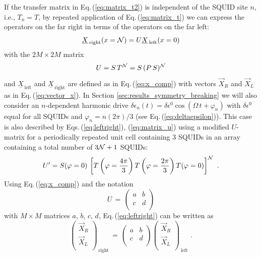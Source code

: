If the transfer matrix in Eq.\,(\ref{eq:matrix_t2}) is independent of the SQUID site $n$, 
i.e., $T_n = T$, by repeated application of Eq.\,(\ref{eq:matrix_t}) we can express the 
operators on the far right in terms of the operators on the far left:
%
\begin{equation} \label{eq:leftright}
\underline{X}_{\, \text{right}}(x={\cal N}) = U \underline{X}_{\,\text{left}}(x=0)
\end{equation}
%
with the $2M \times 2M$ matrix
%
\begin{equation} \label{eq:matrix_u}
U = S \, T^{\cal N} = S \, (P \, S)^{\cal N}
\end{equation}
%
and $\underline{X}_{\,\text{left}}$ and $\underline{X}_{\,\text{right}}$ are defined 
as in Eq.\,(\ref{eq:x_comp}) with vectors $\vec{X}_R$ and $\vec{X}_L$ as in 
Eq.\,(\ref{eq:vector_x}). 
In Section \ref{sec:results_symmetry_breaking} we will also consider an $n$-dependent harmonic drive 
$\delta \epsilon_n(t) = \delta \epsilon^0 \cos(\Omega \, t + \varphi_n)$
with $\delta \epsilon^0$ equal for all SQUIDs and
$\varphi_n = n (2 \pi) / 3$ (see Eq.\,(\ref{eq:deltaepsilon})).
This case is also described by Eqs.\,(\ref{eq:leftright}), (\ref{eq:matrix_u}) 
using a modified $U$-matrix for a periodically repeated unit 
cell containing 3 SQUIDs in an array containing a total number of $3 {\cal N} + 1$ SQUIDs:
%
\begin{equation} \label{eq:matrix_u2}
U' = S(\varphi=0) \, \left[T\left(\varphi =  \frac{4\pi}{3}  \right) T\left(\varphi =  \frac{2\pi}{3} \right) T(\varphi = 0) \right]^{\cal N} \, \, .
\end{equation}
%
\noindent
Using Eq.\,(\ref{eq:x_comp}) and the notation 
%
\begin{equation} \label{eq:abcd}
U \, = \,  
\begin{pmatrix}
a & b \\
c & d \\
\end{pmatrix}
\end{equation}
%
with $M \times M$ matrices $a$, $b$, $c$, $d$, 
Eq.\,(\ref{eq:leftright}) can be written as
%
\begin{equation} \label{eq:leftright2}
\begin{pmatrix}
\vec{X}_R \\
\vec{X}_L \\
\end{pmatrix}_{\, \text{right}} \, = \,
\begin{pmatrix}
a & b \\
c & d \\
\end{pmatrix}
\begin{pmatrix}
\vec{X}_R \\
\vec{X}_L \\
\end{pmatrix}_{\, \text{left}} \, \, .
\end{equation}

